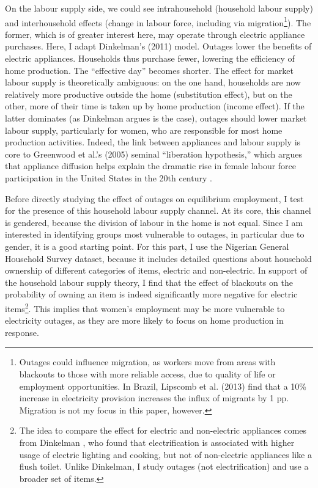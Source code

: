 \documentclass[12pt]{article}
\begin{document}
\par
On the labour supply side, we could see intrahousehold (household labour supply) and interhousehold effects (change in labour force, including via migration\footnote{Outages could influence migration, as workers move from areas with blackouts to those with more reliable access, due to quality of life or employment opportunities. In Brazil, Lipscomb et al. (2013) \cite{lipscomb2013a} find that a 10\% increase in electricity provision increases the influx of migrants by 1 pp. Migration is not my focus in this paper, however.}). The former, which is of greater interest here, may operate through electric appliance purchases. Here, I adapt Dinkelman's (2011) \cite{dinkelman2011a} model. Outages lower the benefits of electric appliances. Households thus purchase fewer, lowering the efficiency of home production. The “effective day” becomes shorter. The effect for market labour supply is theoretically ambiguous: on the one hand, households are now relatively more productive outside the home (substitution effect), but on the other, more of their time is taken up by home production (income effect). If the latter dominates (as Dinkelman argues is the case), outages should lower market labour supply, particularly for women, who are responsible for most home production activities. Indeed, the link between appliances and labour supply is core to Greenwood et al.’s (2005) \cite{greenwood2005a} seminal “liberation hypothesis,” which argues that appliance diffusion helps explain the dramatic rise in female labour force participation in the United States in the 20th century \cite{cardia2008a} \cite{v2008a}.
\par
Before directly studying the effect of outages on equilibrium employment, I test for the presence of this household labour supply channel. At its core, this channel is gendered, because the division of labour in the home is not equal. Since I am interested in identifying groups most vulnerable to outages, in particular due to gender, it is a good starting point. For this part, I use the Nigerian General Household Survey dataset, because it includes detailed questions about household ownership of different categories of items, electric and non-electric. In support of the household labour supply theory, I find that the effect of blackouts on the probability of owning an item is indeed significantly more negative for electric items\footnote{The idea to compare the effect for electric and non-electric appliances comes from Dinkelman \cite{dinkelman2011a}, who found that electrification is associated with higher usage of electric lighting and cooking, but not of non-electric appliances like a flush toilet. Unlike Dinkelman, I study outages (not electrification) and use a broader set of items.}. This implies that women’s employment may be more vulnerable to electricity outages, as they are more likely to focus on home production in response. 
\end{document}

